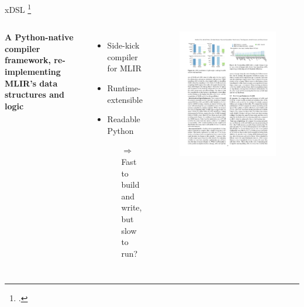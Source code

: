 \documentclass[10pt,aspectratio=169]{beamer}
\renewcommand{\cite}{\footcite}
\begin{document}
\begin{frame}{xDSL \cite{fehrXDSLSidekickCompilation2025}}
    \begin{columns}[T,onlytextwidth]
            \vspace{2em}
            {\large \textbf{A Python-native compiler framework, re-implementing MLIR’s data structures and logic}}
            \vspace{1.5em}
            \begin{itemize}
                \itemindent=-13pt
                \item Side-kick compiler for MLIR
                \item Runtime-extensible
                \item Readable Python%
                \begin{itemize}
                    \itemindent=-13pt
                    \item[$\Rightarrow$] Fast to build and write, but slow to run?
                \end{itemize}
            \end{itemize}
            \begin{figure}[H]
                \includegraphics[width=\textwidth]{images/compile_times.pdf}

\end{figure}
\end{columns}
\end{frame}
\end{document}
